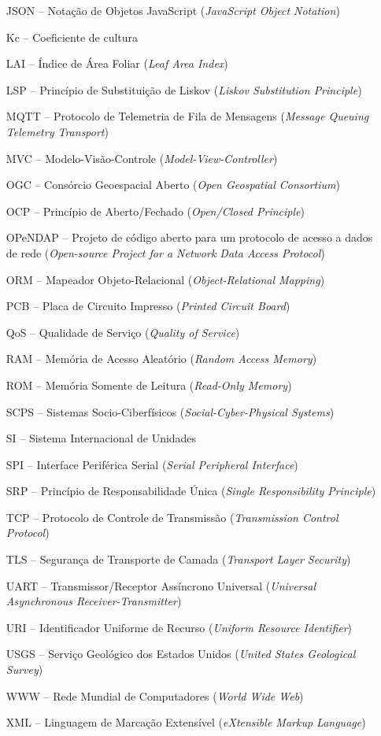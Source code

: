 {\begin{itemize}[]
    \item[JSON] -- Notação de Objetos JavaScript (\textit{JavaScript Object Notation})
    \item[Kc] -- Coeficiente de cultura
    \item[LAI] -- Índice de Área Foliar (\textit{Leaf Area Index})
    \item[LSP] -- Princípio de Substituição de Liskov (\textit{Liskov Substitution Principle})
    \item[MQTT] -- Protocolo de Telemetria de Fila de Mensagens (\textit{Message Queuing Telemetry Transport})
    \item[MVC] -- Modelo-Visão-Controle (\textit{Model-View-Controller})
    \item[OGC] -- Consórcio Geoespacial Aberto (\textit{Open Geospatial Consortium})
    \item[OCP] -- Princípio de Aberto/Fechado (\textit{Open/Closed Principle})
    \item[OPeNDAP] -- Projeto de código aberto para um protocolo de acesso a dados de rede (\textit{Open-source Project for a Network Data Access Protocol})
    \item[ORM] -- Mapeador Objeto-Relacional (\textit{Object-Relational Mapping}) 
    \item[PCB] -- Placa de Circuito Impresso (\textit{Printed Circuit Board})
    \item[QoS] -- Qualidade de Serviço (\textit{Quality of Service})
    \item[RAM] -- Memória de Acesso Aleatório (\textit{Random Access Memory})
    \item[ROM] -- Memória Somente de Leitura (\textit{Read-Only Memory})
    \item[SCPS] -- Sistemas Socio-Ciberfísicos (\textit{Social-Cyber-Physical Systems})
    \item[SI] -- Sistema Internacional de Unidades
    \item[SPI] -- Interface Periférica Serial (\textit{Serial Peripheral Interface})
    \item[SRP] -- Princípio de Responsabilidade Única (\textit{Single Responsibility Principle})
    \item[TCP] -- Protocolo de Controle de Transmissão (\textit{Transmission Control Protocol})
    \item[TLS] -- Segurança de Transporte de Camada (\textit{Transport Layer Security})
    \item[UART] -- Transmissor/Receptor Assíncrono Universal (\textit{Universal Asynchronous Receiver-Transmitter})
    \item[URI] -- Identificador Uniforme de Recurso (\textit{Uniform Resource Identifier})
    \item[USGS] -- Serviço Geológico dos Estados Unidos (\textit{United States Geological Survey})
    \item[WWW] -- Rede Mundial de Computadores (\textit{World Wide Web})
    \item[XML] -- Linguagem de Marcação Extensível (\textit{eXtensible Markup Language})
 \end{itemize}
}

